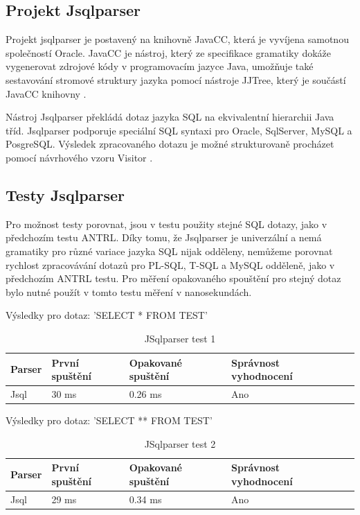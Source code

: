 \documentclass[czech,bachelor,public,dept460,male,cpdeclaration,twoside]{diploma}
\begin{document}
\subsection{Projekt Jsqlparser}
Projekt jsqlparser je postavený na knihovně JavaCC, která je vyvíjena samotnou společností Oracle. JavaCC je nástroj, který ze specifikace gramatiky dokáže vygenerovat zdrojové kódy v programovacím jazyce Java, umožňuje také sestavování stromové struktury jazyka pomocí nástroje JJTree, který je součástí JavaCC knihovny \cite{jsql}.


Nástroj Jsqlparser překládá dotaz jazyka SQL na ekvivalentní hierarchii Java tříd. Jsqlparser podporuje speciální SQL syntaxi pro Oracle, SqlServer, MySQL a PosgreSQL. Výsledek zpracovaného dotazu je možné strukturovaně procházet pomocí návrhového vzoru Visitor \cite{jsqld}.


\subsection{Testy Jsqlparser}
Pro možnost testy porovnat, jsou v testu použity stejné SQL dotazy, jako v předchozím testu ANTRL. Díky tomu, že Jsqlparser je univerzální a nemá gramatiky pro různé variace jazyka SQL nijak odděleny, nemůžeme porovnat rychlost zpracovávání dotazů pro PL-SQL, T-SQL a MySQL odděleně, jako v předchozím ANTRL testu. Pro měření opakovaného spouštění pro stejný dotaz bylo nutné použít v tomto testu měření v nanosekundách.

\begin{table}[!htbp]
	\centering
	\caption{JSqlparser test 1}
	Výsledky pro dotaz: 'SELECT * FROM TEST'
	\vskip 0.1cm
	\label{tab:jsql1}
	\begin{tabular}{lllll}
		\toprule
		Parser & První spuštění & Opakované spuštění & Správnost vyhodnocení\\
		\midrule
		Jsql & 30 ms & 0.26 ms & Ano \\
		\midrule
	\end{tabular}
\end{table}

\begin{table}[!htbp]
	\centering
	\caption{JSqlparser test 2}
	Výsledky pro dotaz: 'SELECT ** FROM TEST'
	\vskip 0.1cm
	\label{tab:jsql2}
	\begin{tabular}{lllll}
		\toprule
		Parser & První spuštění & Opakované spuštění & Správnost vyhodnocení\\
		\midrule
		Jsql & 29 ms & 0.34 ms & Ano \\
		\midrule
	\end{tabular}
\end{table}
\end{document}
